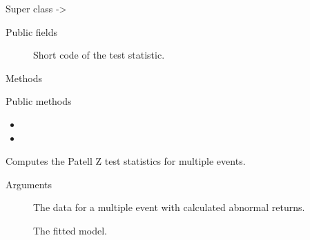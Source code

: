 \documentclass[a4paper]{book}
\begin{document}
%
\begin{Section}{Super class}
 -> 
\end{Section}
%
\begin{Section}{Public fields}

\begin{description}

\item[] Short code of the test statistic.

\end{description}


\end{Section}
%
\begin{Section}{Methods}
%
\begin{SubSection}{Public methods}
\begin{itemize}

\item{} 
\item{} 

\end{itemize}

\end{SubSection}




\hypertarget{method-PatellZTest-compute}{}
%
\begin{SubSection}{}
Computes the Patell Z test statistics for multiple events.
%

%
\begin{SubSubSection}{Arguments}

\begin{description}

\item[] The data for a multiple event with
calculated abnormal returns.
\item[] The fitted model.

\end{description}




\end{SubSubSection}
\end{SubSection}
\end{Section}
\end{document}
